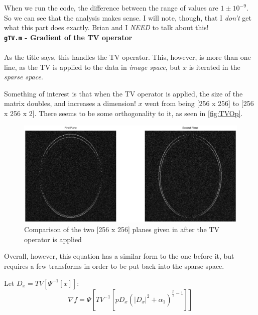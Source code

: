 \documentclass[11 pt]{article}
\newcommand{\bo}{\noindent\textbf}
\begin{document}
            When we run the code, the difference between the range of values are $1 \pm 10^{-9}$. So we can see that the analysis makes sense. I will note, though, that I \emph{don't} get what this part does exactly. Brian and I \emph{NEED} to talk about this!\\

          \bo{\texttt{gTV.m} - Gradient of the TV operator}
            \hfill\\\\
            \noindent As the title says, this handles the TV operator. This, however, is more than one line, as the TV is applied to the data in \emph{image space}, but $x$ is iterated in the \emph{sparse space}.

            Something of interest is that when the TV operator is applied, the size of the matrix doubles, and increases a dimension! $x$ went from being [256 x 256] to [256 x 256 x 2]. There seems to be some orthogonality to it, as seen in \autoref{fig:TVOp}.

            \begin{figure}[!ht] 

              \centering
              \vspace{0pt}
              \setlength\fboxsep{0pt}
              \setlength\fboxrule{0.5pt}
              \includegraphics[trim = {20mm 60mm 20mm 50mm},clip,scale = 0.4] {Figs/CS_Code/TVOperated.eps}
              \caption{Comparison of the two [256 x 256] planes given in after the TV operator is applied}
              \label{fig:TVOp}

              \end{figure}

            Overall, however, this equation has a similar form to the one before it, but requires a few transforms in order to be put back into the sparse space.

            \noindent Let $D_x = TV[\Psi^{-1}[x]]$: 
            \[ \nabla f = \Psi[TV^{-1}[p D_x (|D_x|^2 + \alpha_1)^{\frac{p}{2} - 1}]]\]
\end{document}
